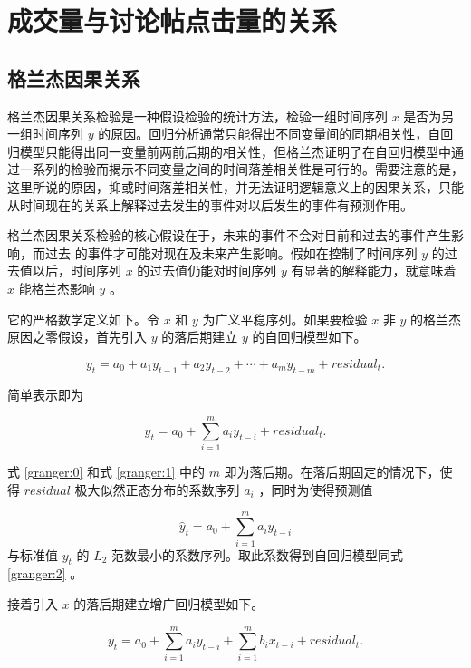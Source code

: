 \chapter{成交量与讨论帖点击量的关系}

\section{格兰杰因果关系}

格兰杰因果关系检验\cite{granger_causality}是一种假设检验的统计方法，检验一组时间序列 $x$ 是否为另一组时间序列 $y$ 的原因。回归分析通常只能得出不同变量间的同期相关性，自回归模型只能得出同一变量前两前后期的相关性，但格兰杰证明了在自回归模型中通过一系列的检验而揭示不同变量之间的时间落差相关性是可行的。需要注意的是，这里所说的原因，抑或时间落差相关性，并无法证明逻辑意义上的因果关系，只能从时间现在的关系上解释过去发生的事件对以后发生的事件有预测作用。

格兰杰因果关系检验的核心假设在于，未来的事件不会对目前和过去的事件产生影响，而过去
的事件才可能对现在及未来产生影响。假如在控制了时间序列 $y$ 的过去值以后，时间序列 $x$ 的过去值仍能对时间序列 $y$ 有显著的解释能力，就意味着 $x$ 能格兰杰影响 $y$ 。

它的严格数学定义如下。令 $x$ 和 $y$ 为广义平稳序列。如果要检验 $x$ 非 $y$ 的格兰杰原因之零假设，首先引入 $y$ 的落后期建立 $y$ 的自回归模型如下。

\begin{equation}
  \label{granger:0}
  y_{t}=a_{0}+a_{1}y_{t-1}+a_{2}y_{t-2}+\cdots+a_{m}y_{t-m}+residual_{t}.
\end{equation}

简单表示即为

\begin{equation}
  \label{granger:1}
  y_{t}=a_{0}+\sum_{i=1}^{m}a_{i}y_{t-i}+residual_{t}.
\end{equation}

式 \ref{granger:0} 和式 \ref{granger:1} 中的 $m$ 即为落后期。在落后期固定的情况下，使得 $residual$ 极大似然正态分布的系数序列 $a_{i}$ ，同时为使得预测值

\begin{equation}
  \label{granger:2}
  \hat{y}_{t}=a_{0}+\sum_{i=1}^{m}a_{i}y_{t-i}
\end{equation}
与标准值 $y_{t}$ 的 $L_{2}$ 范数最小的系数序列。取此系数得到自回归模型同式 \ref{granger:2} 。

接着引入 $x$ 的落后期建立增广回归模型如下。

\begin{equation}
  \label{granger:3}
  y_{t}=a_{0}+\sum_{i=1}^{m}a_{i}y_{t-i}+\sum_{i=1}^{m}b_{i}x_{t-i}+residual_{t}.
\end{equation}

